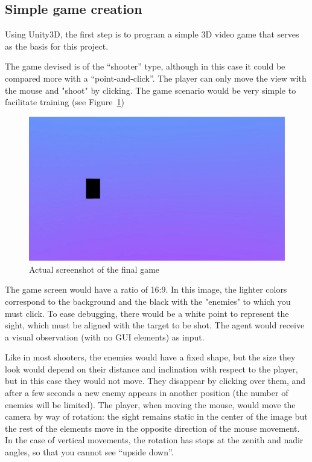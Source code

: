 \subsection{Simple game creation}

Using Unity3D, the first step is to program a simple 3D video game that serves as the basis for this project.

The game devised is of the “shooter” type, although in this case it could be compared more with a “point-and-click”. The player can only move the view with the mouse and "shoot" by clicking. The game scenario would be very simple to facilitate training (see Figure~\ref{fig:ingame})

\begin{figure}[h]
  \centering
		\includegraphics[width=.9\textwidth]{img/inGame.png}
  \caption{Actual screenshot of the final game}
  \label{fig:ingame}
\end{figure}

The game screen would have a ratio of 16:9. In this image, the lighter colors correspond to the background and the black with the "enemies" to which you must click. To ease debugging, there would be a white point to represent the sight, which must be aligned with the target to be shot. The agent would receive a visual observation (with no GUI elements) as input.

Like in most shooters, the enemies would have a fixed shape, but the size they look would depend on their distance and inclination with respect to the player, but in this case they would not move. They disappear by clicking over them, and after a few seconds a new enemy appears in another position (the number of enemies will be limited).
The player, when moving the mouse, would move the camera by way of rotation: the sight remains static in the center of the image but the rest of the elements move in the opposite direction of the mouse movement. In the case of vertical movements, the rotation has stops at the zenith and nadir angles, so that you cannot see “upside down”.

